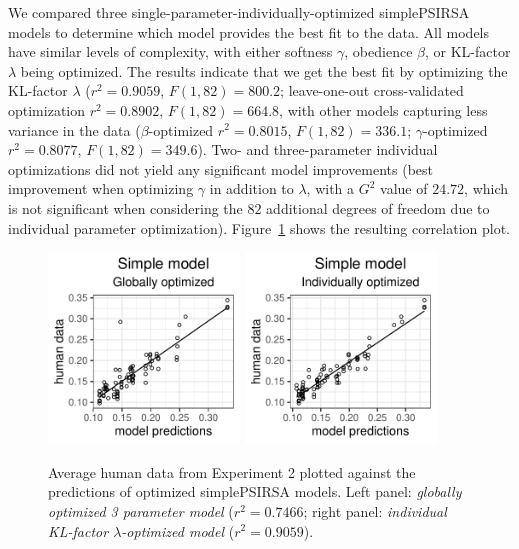 \documentclass[10pt,a4paper]{article}
\begin{document}
We compared three single-parameter-individually-optimized simplePSIRSA models to determine which model provides the best fit to the data. 
All models have similar levels of complexity, with either softness $\gamma$, obedience $\beta$, or KL-factor $\lambda$ being optimized.
The results indicate that we get the best fit by optimizing the KL-factor $\lambda$ ($r^{2}=0.9059$, $F(1,82) = 800.2$; leave-one-out cross-validated optimization $r^{2}=0.8902$, $F(1,82) = 664.8$, with other models capturing less variance in the data ($\beta$-optimized $r^{2}=0.8015$, $F(1,82) = 336.1$; $\gamma$-optimized $r^{2}=0.8077$, $F(1,82) = 349.6$).
Two- and three-parameter individual optimizations did not yield any significant model improvements (best improvement when optimizing $\gamma$ in addition to $\lambda$, with a $G^2$ value of $24.72$, which is not significant when considering the $82$ additional degrees of freedom due to individual parameter optimization).
Figure~\ref{global-individual-x3} shows the resulting correlation plot. 
 
\begin{figure}[ht]
	\centering
	\includegraphics[width=2in]{images/x3_m24.pdf}
	\includegraphics[width=2in]{images/x3_m11.pdf}
	\caption{Average human data from Experiment 2 plotted against the predictions of optimized simplePSIRSA models.
		Left panel: \emph{globally optimized 3 parameter model} ($r^{2}=0.7466$;
		right panel: \emph{individual KL-factor $\lambda$-optimized model} ($r^{2}=0.9059$). }
	\label{global-individual-x3}
\end{figure}
\end{document}
